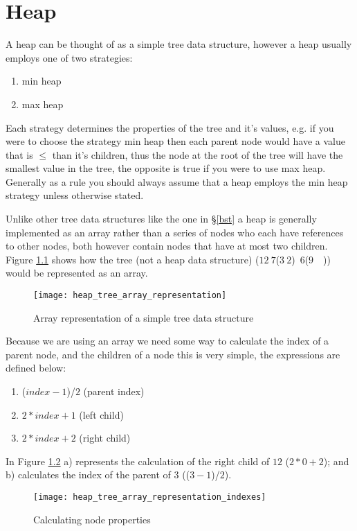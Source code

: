 \chapter{Heap}
A heap can be thought of as a simple tree data structure, however a heap usually employs one of two strategies:

\begin{enumerate}
\item min heap
\item max heap
\end{enumerate}

Each strategy determines the properties of the tree and it's values, e.g. if you were to choose the strategy min heap then each parent node would have a value that is $\leq$ than it's children, thus the node at the root of the tree will have the smallest value in the tree, the opposite is true if you were to use max heap. Generally as a rule you should always assume that a heap employs the min heap strategy unless otherwise stated.

Unlike other tree data structures like the one in \S\ref{bst} a heap is generally implemented as an array rather than a series of nodes who each have references to other nodes, both however contain nodes that have at most two children. Figure \ref{fig:tree_array_representation} shows how the tree (not a heap data structure) ($12~7$($3~2$)~$6$($9$~~)) would be represented as an array.

\begin{figure}
\begin{center}
\texttt{[image: heap\_tree\_array\_representation]}
\end{center}
\caption{Array representation of a simple tree data structure} \label{fig:tree_array_representation}
\end{figure}

Because we are using an array we need some way to calculate the index of a parent node, and the children of a node this is very simple, the expressions are defined below:

\begin{enumerate}
\item ($index - 1$)/$2$ (parent index)
\item $2 * index + 1$ (left child)
\item $2 * index + 2$ (right child)
\end{enumerate}

In Figure \ref{fig:heap_tree_array_representation_indexes} a) represents the calculation of the right child of $12$ ($2 * 0 + 2$); and b) calculates the index of the parent of $3$ (($3 - 1$)/$2$).

\begin{figure}
\begin{center}
\texttt{[image: heap\_tree\_array\_representation\_indexes]}
\caption{Calculating node properties} \label{fig:heap_tree_array_representation_indexes}
\end{center}
\end{figure} 


